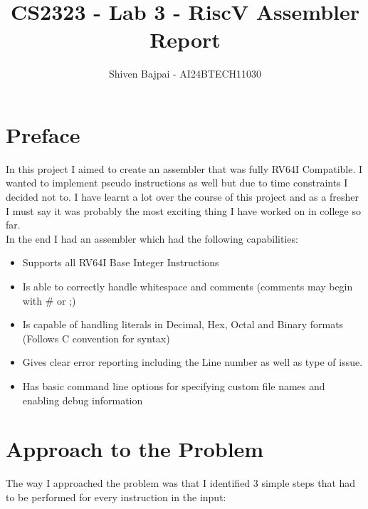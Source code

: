 \documentclass[12pt]{article}
\begin{document}
	
	\vspace{3cm}

	\title{CS2323 - Lab 3 - RiscV Assembler Report}
	\author{Shiven Bajpai - AI24BTECH11030}

	\maketitle
	\bigskip    	

	\renewcommand{\thefigure}{\theenumi}
	\renewcommand{\thetable}{\theenumi}

	\tableofcontents
	\newpage

    \section{Preface}
    In this project I aimed to create an assembler that was fully RV64I Compatible. I wanted to implement pseudo instructions as well but due to time constraints I decided not to. I have learnt a lot over the course of this project and as a fresher I must say it was probably the most exciting thing I have worked on in college so far.
    \\

    In the end I had an assembler which had the following capabilities:
    \begin{itemize}
        \item Supports all RV64I Base Integer Instructions
        \item Is able to correctly handle whitespace and comments (comments may begin with \# or ;)
        \item Is capable of handling literals in Decimal, Hex, Octal and Binary formats (Follows C convention for syntax)
        \item Gives clear error reporting including the Line number as well as type of issue.
        \item Has basic command line options for specifying custom file names and enabling debug information
    \end{itemize}

    \section{Approach to the Problem}

    The way I approached the problem was that I identified 3 simple steps that had to be performed for every instruction in the input:
\end{document}

